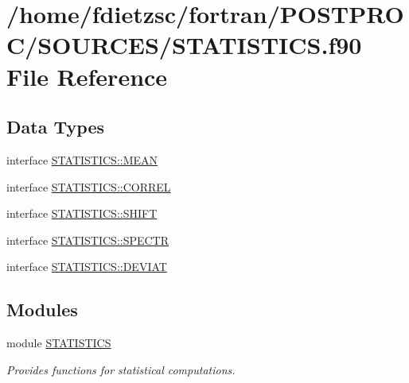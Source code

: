 \hypertarget{STATISTICS_8f90}{
\section{/home/fdietzsc/fortran/POSTPROC/SOURCES/STATISTICS.f90 File Reference}
\label{STATISTICS_8f90}
}
\subsection*{Data Types}
\begin{DoxyCompactItemize}
\item 
interface \hyperlink{interfaceSTATISTICS_1_1MEAN}{STATISTICS::MEAN}
\item 
interface \hyperlink{interfaceSTATISTICS_1_1CORREL}{STATISTICS::CORREL}
\item 
interface \hyperlink{interfaceSTATISTICS_1_1SHIFT}{STATISTICS::SHIFT}
\item 
interface \hyperlink{interfaceSTATISTICS_1_1SPECTR}{STATISTICS::SPECTR}
\item 
interface \hyperlink{interfaceSTATISTICS_1_1DEVIAT}{STATISTICS::DEVIAT}
\end{DoxyCompactItemize}
\subsection*{Modules}
\begin{DoxyCompactItemize}
\item 
module \hyperlink{namespaceSTATISTICS}{STATISTICS}


\begin{DoxyCompactList}\small\item\em Provides functions for statistical computations. \end{DoxyCompactList}

\end{DoxyCompactItemize}
